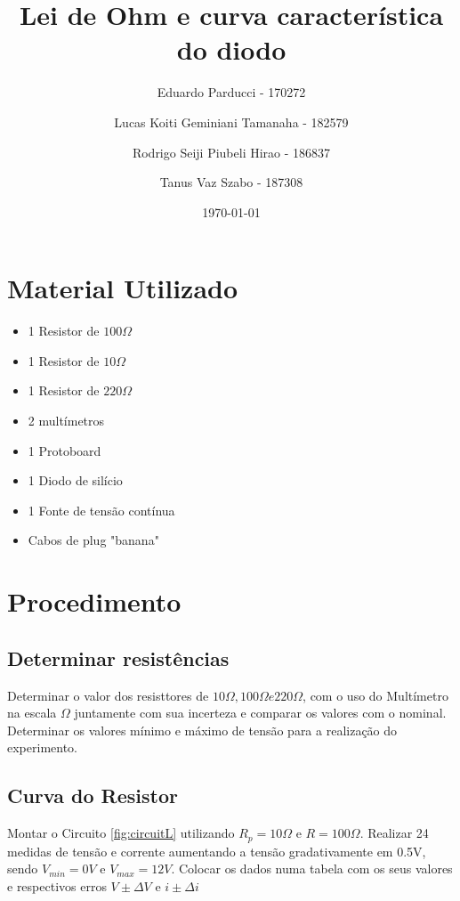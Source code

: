 \documentclass{article}
\title{Lei de Ohm e curva característica do diodo}
\author{
    Eduardo Parducci - 170272
    \and
    Lucas Koiti Geminiani Tamanaha - 182579
    \and
    Rodrigo Seiji Piubeli Hirao - 186837
    \and
    Tanus Vaz Szabo - 187308
}
\date{\today}
\begin{document}
    \maketitle
    \newpage
    \tableofcontents
    \newpage
    \listoffigures
    \newpage
    \section{Material Utilizado}
        \begin{itemize}
            \item 1 Resistor de $100\Omega$
            \item 1 Resistor de $10\Omega$
            \item 1 Resistor de $220\Omega$
            \item 2 multímetros
            \item 1 Protoboard
            \item 1 Diodo de silício
            \item 1 Fonte de tensão contínua
            \item Cabos de plug "banana"
        \end{itemize}
    \section{Procedimento}
        \subsection{Determinar resistências}
            Determinar o valor dos resisttores de 
            $10\Omega, 100\Omega e 220\Omega$, 
            com o uso do Multímetro na escala $\Omega$ 
            juntamente com sua incerteza e comparar os valores com o nominal.
            \newline
            Determinar os valores mínimo e máximo de tensão para a realização do experimento.
        \subsection{Curva do Resistor}
            Montar o Circuito \ref{fig:circuitL} 
            utilizando $R_p = 10\Omega$ e $R = 100\Omega$.
            \newline
            Realizar 24 medidas de tensão e corrente aumentando 
            a tensão gradativamente em 0.5V, sendo $V_{min}=0V$ e $V_{max}=12V$. 
            \newline
            Colocar os dados numa tabela com os seus valores e respectivos erros $V\pm\Delta V$
            e $i\pm\Delta i$
\end{document}
